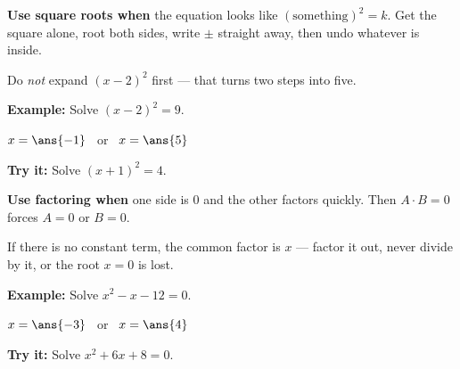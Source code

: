 \documentclass[12pt]{article}
\begin{document}


\begin{formulabox}
\textbf{Use square roots when} the equation looks like $(\text{something})^2 = k$. Get the square alone, root both sides, write $\pm$ straight away, then undo whatever is inside.\par\smallskip
Do \emph{not} expand $(x-2)^2$ first --- that turns two steps into five.
\end{formulabox}

\begin{examplebox}
\textbf{Example:} \quad Solve $(x-2)^2 = 9$.
\par
$x = \ans{-1}$ \ or \ $x = \ans{5}$
\end{examplebox}

\begin{tryitbox}
\textbf{Try it:} \quad Solve $(x+1)^2 = 4$.\\[2pt]
\end{tryitbox}


\begin{formulabox}
\textbf{Use factoring when} one side is $0$ and the other factors quickly. Then $A \cdot B = 0$ forces $A = 0$ or $B = 0$.\par\smallskip
If there is no constant term, the common factor is $x$ --- factor it out, never divide by it, or the root $x = 0$ is lost.
\end{formulabox}

\begin{examplebox}
\textbf{Example:} \quad Solve $x^2 - x - 12 = 0$.
\par
$x = \ans{-3}$ \ or \ $x = \ans{4}$
\end{examplebox}

\begin{tryitbox}
\textbf{Try it:} \quad Solve $x^2 + 6x + 8 = 0$.\\[2pt]
\end{tryitbox}
\end{document}
